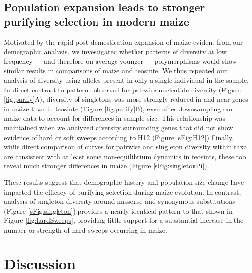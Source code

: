 \documentclass{pnastwo}
\newcommand{\citex}{\textcolor{red}{\bf CITE}}
\newcommand{\X}{\textcolor{red}{\bf X}}
\begin{document}
\begin{article}

\subsection{Population expansion leads to stronger purifying selection in modern maize}
Motivated by the rapid post-domestication expansion of maize evident from our demographic analysis, we investigated whether patterns of diversity at low frequency --- and therefore on average younger --- polymorphisms would show similar results in comparisons of maize and teosinte.
We thus repeated our analysis of diversity using alleles present in only a single individual in the sample.
In direct contrast to patterns observed for pairwise nucleotide diversity (Figure \ref{fig:purify}A), diversity of singletons was more strongly reduced in and near genes in maize than in teosinte (Figure \ref{fig:purify}B), even after downsampling our maize data to account for differences in sample size. This relationship was maintained when we analyzed diversity surrounding genes that did not show evidence of hard or soft sweeps according to H12 (Figure \ref{sFig:H12})
Finally, while direct comparison of curves for pairwise and singleton diversity within taxa are consistent with at least some non-equilibrium dynamics in teosinte, these too reveal much stronger differences in maize (Figure \ref{sFig:singletonPi}). %

These results suggest that demographic history and population size change have impacted the efficacy of purifying selection during maize evolution.
In contrast, analysis of singleton diversity around missense and synonymous substitutions (Figure \ref{sFig:singleton}) provides a nearly identical pattern to that shown in Figure \ref{fig:hardSweeps}, providing little support for a substantial increase in the number or strength of hard sweeps occurring in maize.  

\section{Discussion}


\end{article}
\end{document}
